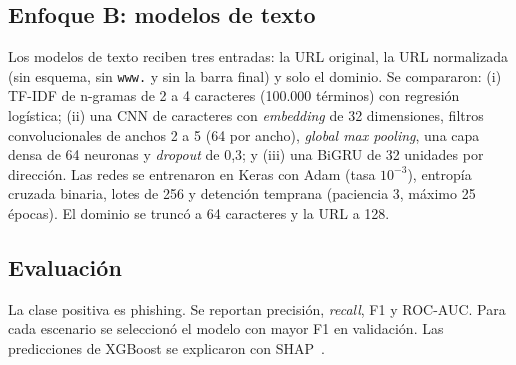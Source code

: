\subsection{Enfoque B: modelos de texto}
Los modelos de texto reciben tres entradas: la URL original, la URL normalizada (sin esquema, sin \texttt{www.} y sin la barra final) y solo el dominio. Se compararon: (i) TF-IDF de n-gramas de 2 a 4 caracteres (100.000 términos) con regresión logística; (ii) una CNN de caracteres con \emph{embedding} de 32 dimensiones, filtros convolucionales de anchos 2 a 5 (64 por ancho), \emph{global max pooling}, una capa densa de 64 neuronas y \emph{dropout} de 0,3; y (iii) una BiGRU de 32 unidades por dirección. Las redes se entrenaron en Keras con Adam (tasa $10^{-3}$), entropía cruzada binaria, lotes de 256 y detención temprana (paciencia 3, máximo 25 épocas). El dominio se truncó a 64 caracteres y la URL a 128.

\subsection{Evaluación}
La clase positiva es phishing. Se reportan precisión, \emph{recall}, F1 y ROC-AUC. Para cada escenario se seleccionó el modelo con mayor F1 en validación. Las predicciones de XGBoost se explicaron con SHAP~\cite{lundberg2017}.

